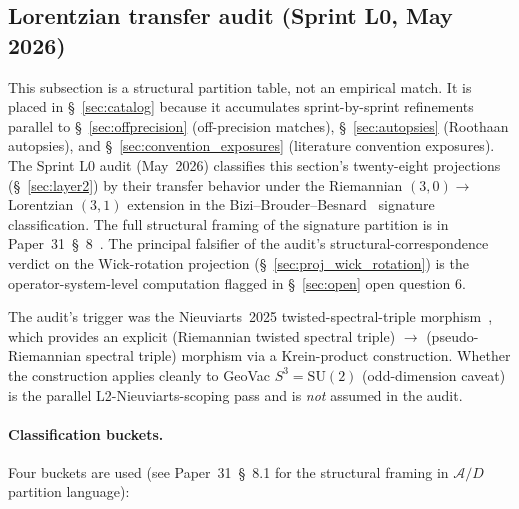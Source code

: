 \documentclass[11pt]{article}
\begin{document}
\subsection{Lorentzian transfer audit (Sprint L0, May 2026)}
\label{sec:lorentzian_transfer_audit}

This subsection is a structural partition table, not an empirical
match.  It is placed in \S~\ref{sec:catalog} because it accumulates
sprint-by-sprint refinements parallel to \S~\ref{sec:offprecision}
(off-precision matches), \S~\ref{sec:autopsies} (Roothaan autopsies),
and \S~\ref{sec:convention_exposures} (literature convention
exposures).  The Sprint L0 audit
(May~2026) classifies
this section's twenty-eight projections (\S~\ref{sec:layer2}) by their
transfer behavior under the Riemannian $(3, 0) \to$ Lorentzian $(3, 1)$
extension in the Bizi--Brouder--Besnard~\cite{bizi_brouder_besnard2018}
signature classification.  The full structural framing of the
signature partition is in Paper~31~\S~8~\cite{paper31}.  The principal
falsifier of the audit's structural-correspondence verdict on the
Wick-rotation projection (\S~\ref{sec:proj_wick_rotation}) is the
operator-system-level computation flagged in \S~\ref{sec:open} open
question 6.

The audit's trigger was the Nieuviarts~2025
twisted-spectral-triple morphism~\cite{nieuviarts2025a}, which provides
an explicit (Riemannian twisted spectral triple) $\to$
(pseudo-Riemannian spectral triple) morphism via a Krein-product
construction.  Whether the construction applies cleanly to
GeoVac $S^3 = \mathrm{SU}(2)$ (odd-dimension caveat) is the parallel
L2-Nieuviarts-scoping pass and is \emph{not} assumed in the audit.

\paragraph{Classification buckets.}
Four buckets are used (see Paper~31~\S~8.1 for the structural framing
in $\mathcal{A}/D$ partition language):
\end{document}
